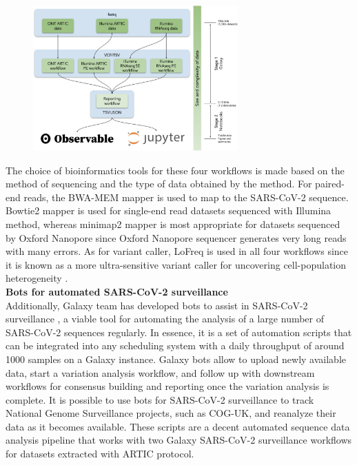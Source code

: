         \begin{figure}[ht!]
        	\centering
            \includegraphics[width=0.7\textwidth]{figures/intro/galaxy-analysis.jpg}
            \label{fig:intro:galaxy-effort}
        \end{figure}
        
        The choice of bioinformatics tools for these four workflows is made based on the method of sequencing and the type of data obtained by the method. For paired-end reads, the BWA-MEM \cite{li2013,burrows} mapper is used to map to the SARS-CoV-2 sequence. Bowtie2 \cite{ultrafast,langmead2012} mapper is used for single-end read datasets sequenced with Illumina method, whereas minimap2 \cite{burrows,li2018} mapper is most appropriate for datasets sequenced by Oxford Nanopore since Oxford Nanopore sequencer generates very long reads with many errors. As for variant caller, LoFreq is used in all four workflows since it is known as a more ultra-sensitive variant caller for uncovering cell-population heterogeneity \cite{lofreq}.\\

        \textbf{Bots for automated SARS-CoV-2 surveillance } \\
        
        Additionally, Galaxy team has developed bots to assist in SARS-CoV-2 surveillance \cite{bots2022}, a viable tool for automating the analysis of a large number of SARS-CoV-2 sequences regularly. In essence, it is a set of automation scripts that can be integrated into any scheduling system with a daily throughput of around 1000 samples on a Galaxy instance. Galaxy bots allow to upload newly available data, start a variation analysis workflow, and follow up with downstream workflows for consensus building and reporting once the variation analysis is complete. It is possible to use bots for SARS-CoV-2 surveillance to track National Genome Surveillance projects, such as COG-UK, and reanalyze their data as it becomes available. These scripts are a decent automated sequence data analysis pipeline that works with two Galaxy SARS-CoV-2 surveillance workflows for datasets extracted with ARTIC protocol. 
        
